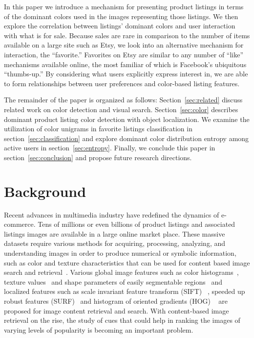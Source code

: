 \documentclass[conference,a4paper]{IEEEtran}
\begin{document}
In this paper we introduce a mechanism for presenting product listings in terms of the dominant colors used in the images representing those listings. We then explore the correlation between listings' dominant colors and user interaction with what is for sale. Because sales are rare in comparison to the number of items available on a large site such as Etsy, we look into an alternative mechanism for interaction, the ``favorite.'' Favorites on Etsy are similar to any number of ``like'' mechanisms available online, the most familiar of which is Facebook's ubiquitous ``thumbs-up.'' By considering what users explicitly express interest in, we are able to form relationships between user preferences and color-based listing features. 
 
The remainder of the paper is organized as follows:
Section~\ref{sec:related} discuss related work on color detection and
visual search. Section~\ref{sec:color} describes dominant product
listing color detection with object localization. We examine the
utilization of color unigrams in favorite listings classification in
section~\ref{sec:classification} and explore dominant color
distribution entropy among active users in
section~\ref{sec:entropy}. Finally, we conclude this paper in
section~\ref{sec:conclusion} and propose future research directions.

\section{Background}
\label{sec:background}
Recent advances in multimedia industry have redefined the dynamics of
e-commerce. Tens of millions or even billions of product listings and associated listings images are
available in a large online market place. These massive datasets require various methods for acquiring, processing,
analyzing, and understanding images in order to produce numerical or symbolic
information, such as color and texture characteristics that can be used for content based image search and retrieval~\cite{
  bhardwajpalette,zhou2012document,faloutsos1994efficient}. 
Various global image features such as color histograms~\cite{rao1999spatial}, texture
values~\cite{haralick1979statistical} and shape parameters of easily segmentable regions~\cite{niblack1993qbic} and localized features such
as scale invariant feature transform (SIFT) ~\cite{lowe2004distinctive}, speeded up
robust features (SURF)~\cite{bay2006surf} and histogram of oriented gradients (HOG)
~\cite{dalal2005histograms} are proposed for image content retrieval
and search.  With content-based image retrieval on the rise, the study of cues that
could help in ranking the images of varying levels of popularity is becoming an important problem.
\end{document}
